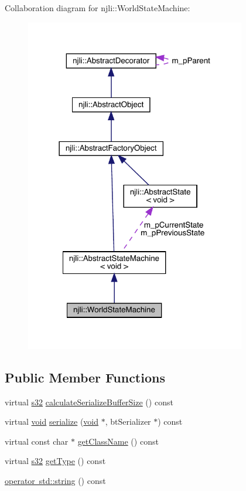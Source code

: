 Collaboration diagram for njli\+:\+:World\+State\+Machine\+:\nopagebreak
\begin{figure}[H]
\begin{center}
\leavevmode
\includegraphics[width=273pt]{classnjli_1_1_world_state_machine__coll__graph}
\end{center}
\end{figure}
\subsection*{Public Member Functions}
\begin{DoxyCompactItemize}
\item 
virtual \mbox{\hyperlink{_util_8h_aa62c75d314a0d1f37f79c4b73b2292e2}{s32}} \mbox{\hyperlink{classnjli_1_1_world_state_machine_a9ac2e728f8e172cf1f81dfea5870343d}{calculate\+Serialize\+Buffer\+Size}} () const
\item 
virtual \mbox{\hyperlink{_thread_8h_af1e856da2e658414cb2456cb6f7ebc66}{void}} \mbox{\hyperlink{classnjli_1_1_world_state_machine_a5c007981ac52707f7474e22b0b59c29a}{serialize}} (\mbox{\hyperlink{_thread_8h_af1e856da2e658414cb2456cb6f7ebc66}{void}} $\ast$, bt\+Serializer $\ast$) const
\item 
virtual const char $\ast$ \mbox{\hyperlink{classnjli_1_1_world_state_machine_a4a0b8431c122f5cb325b3f4e1d4a10cb}{get\+Class\+Name}} () const
\item 
virtual \mbox{\hyperlink{_util_8h_aa62c75d314a0d1f37f79c4b73b2292e2}{s32}} \mbox{\hyperlink{classnjli_1_1_world_state_machine_ab2179e3368a673e88709790a0a6e4bc3}{get\+Type}} () const
\item 
\mbox{\hyperlink{classnjli_1_1_world_state_machine_a5649cb43e236e28b9f3c87e8325e96c9}{operator std\+::string}} () const
\end{DoxyCompactItemize}
